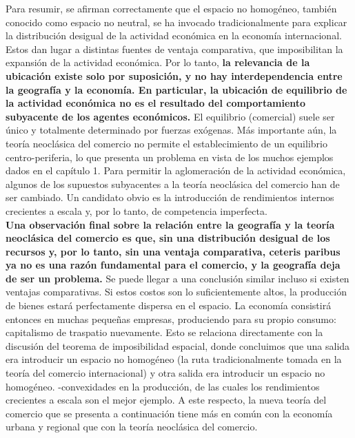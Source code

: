 Para resumir, se afirman correctamente que el espacio no homogéneo, también conocido como espacio no neutral, se ha invocado tradicionalmente para explicar la distribución desigual de la actividad económica en la economía internacional. Estos dan lugar a distintas fuentes de ventaja comparativa, que imposibilitan la expansión de la actividad económica. Por lo tanto, \textbf{la relevancia de la ubicación existe solo por suposición, y no hay interdependencia entre la geografía y la economía. En particular, la ubicación de equilibrio de la actividad económica no es el resultado del comportamiento subyacente de los agentes económicos.} El equilibrio (comercial) suele ser único y totalmente determinado por fuerzas exógenas. Más importante aún, la teoría neoclásica del comercio no permite el establecimiento de un equilibrio centro-periferia, lo que presenta un problema en vista de los muchos ejemplos dados en el capítulo 1. Para permitir la aglomeración de la actividad económica, algunos de los supuestos subyacentes a la teoría neoclásica del comercio han de ser cambiado. Un candidato obvio es la introducción de rendimientos internos crecientes a escala y, por lo tanto, de competencia imperfecta.\\
\textbf{Una observación final sobre la relación entre la geografía y la teoría neoclásica del comercio es que, sin una distribución desigual de los recursos y, por lo tanto, sin una ventaja comparativa, ceteris paribus ya no es una razón fundamental para el comercio, y la geografía deja de ser un problema.} Se puede llegar a una conclusión similar incluso si existen ventajas comparativas. Si estos costos son lo suficientemente altos, la producción de bienes estará perfectamente dispersa en el espacio. La economía consistirá entonces en muchas pequeñas empresas, produciendo para su propio consumo: capitalismo de traspatio nuevamente. Esto se relaciona directamente con la discusión del teorema de imposibilidad espacial, donde concluimos que una salida era introducir un espacio no homogéneo (la ruta tradicionalmente tomada en la teoría del comercio internacional) y otra salida era introducir un espacio no homogéneo. -convexidades en la producción, de las cuales los rendimientos crecientes a escala son el mejor ejemplo. A este respecto, la nueva teoría del comercio que se presenta a continuación tiene más en común con la economía urbana y regional que con la teoría neoclásica del comercio.

